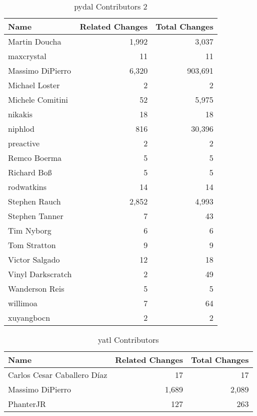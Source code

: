 \documentclass[a4paper,man,natbib,floatsintext]{apa6}
\begin{document}
\begin{table}[ht]
\caption{pydal Contributors 2}
\label{tab:contribs-2.2}
\begin{tabular}{|l|r|r|}
\hline
Name                 & Related Changes & Total Changes \\ \hline
Martin Doucha        & 1,992           & 3,037         \\ \hline
maxcrystal           & 11              & 11            \\ \hline
Massimo DiPierro     & 6,320           & 903,691       \\ \hline
Michael Loster       & 2               & 2             \\ \hline
Michele Comitini     & 52              & 5,975         \\ \hline
nikakis              & 18              & 18            \\ \hline
niphlod              & 816             & 30,396        \\ \hline
preactive            & 2               & 2             \\ \hline
Remco Boerma         & 5               & 5             \\ \hline
Richard Boß          & 5               & 5             \\ \hline
rodwatkins           & 14              & 14            \\ \hline
Stephen Rauch        & 2,852           & 4,993         \\ \hline
Stephen Tanner       & 7               & 43            \\ \hline
Tim Nyborg           & 6               & 6             \\ \hline
Tom Stratton         & 9               & 9             \\ \hline
Victor Salgado       & 12              & 18            \\ \hline
Vinyl Darkscratch    & 2               & 49            \\ \hline
Wanderson Reis       & 5               & 5             \\ \hline
willimoa             & 7               & 64            \\ \hline
xuyangbocn           & 2               & 2             \\ \hline
\end{tabular}
\end{table}

\begin{table}[ht]
\caption{yatl Contributors}
\label{tab:contribs-4}
\begin{tabular}{|l|r|r|}
\hline
Name                           & Related Changes & Total Changes \\ \hline
Carlos Cesar Caballero Díaz    & 17              & 17            \\ \hline
Massimo DiPierro               & 1,689           & 2,089         \\ \hline
PhanterJR                      & 127             & 263           \\ \hline
\end{tabular}
\end{table}
\end{document}
